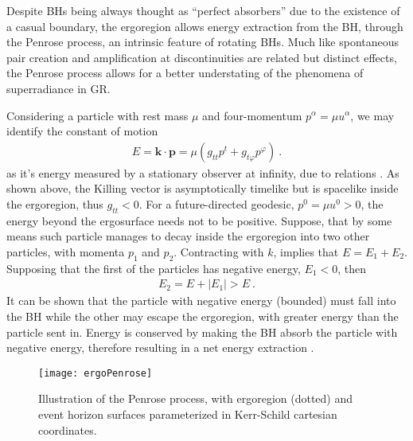 Despite BHs being always thought as ``perfect absorbers'' due to the existence of a casual boundary, the ergoregion allows energy extraction from the BH, through the Penrose process, an intrinsic feature of rotating BHs.
Much like spontaneous pair creation and amplification at discontinuities are related but distinct effects, the Penrose process allows for a better understating of the phenomena of superradiance in GR. 

Considering a particle with rest mass $\mu$ and four-momentum $p^\alpha = \mu u^\alpha$, we may identify the constant of motion 
\begin{align}
    E = \bm{k} \cdot \bm{p} = \mu ( g_{tt} p^t + g_{t\varphi} p^\varphi ) ~.
    \label{eq2:PenroseE0}
\end{align}
as it's energy measured by a stationary observer at infinity, due to relations .
As shown above, the Killing vector is asymptotically timelike but is spacelike inside the ergoregion, thus $g_{tt}<0$.
For a future-directed geodesic, $p^0 = \mu u^0 > 0$, the energy beyond the ergosurface needs not to be positive.
Suppose, that by some means such particle manages to decay inside the ergoregion into two other particles, with momenta $p_1$ and $p_2$. Contracting with $k$, implies that $E = E_1+E_2$. Supposing that the first of the particles has negative energy, $E_1<0$, then 
\begin{align}
    E_2 = E + |E_1| > E ~.
    \label{eq2:PenroseE2}
\end{align}
It can be shown that the particle with negative energy (bounded) must fall into the BH while the other may escape the ergoregion, with greater energy than the particle sent in. 
Energy is conserved by making the BH absorb the particle with negative energy, therefore resulting in a net energy extraction \cite{Townsend1997}.

\begin{figure}[h]
    \centering
    \vspace{0.2cm}
    \texttt{[image: ergoPenrose]}
    \caption{Illustration of the Penrose process, with ergoregion (dotted) and event horizon surfaces parameterized in Kerr-Schild cartesian coordinates.}
    \label{fig2:penroseProcess}
\end{figure}

